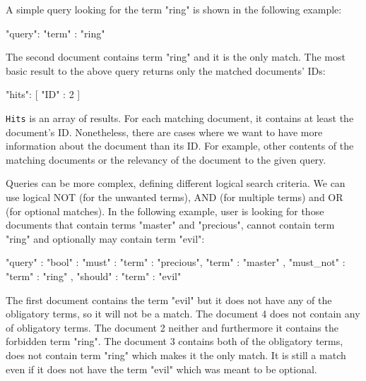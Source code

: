 A simple query looking for the term "ring" is shown in the following example:
\begin{code}
{ "query": { 
    "term" : "ring"
} }
\end{code}
The second document contains term "ring" and it is the only match. The most basic result to the above query returns only the matched documents' IDs:
\begin{code}
{ "hits": [
    { "ID" : 2 } ] 
}
\end{code}
\texttt{Hits} is an array of results. For each matching document, it contains at least the document's ID. Nonetheless, there are cases where we want to have more information about the document than its ID. For example, other contents of the matching documents or the relevancy of the document to the given query.

Queries can be more complex, defining different logical search criteria. We can use logical NOT (for the unwanted terms), AND (for multiple terms) and OR (for optional matches). In the following example, user is looking for those documents that contain terms "master" and "precious", cannot contain term "ring" and optionally may contain term "evil":
\newpage
\begin{code}
{ "query" : { 
     "bool" : {
       "must" : {
        "term" : "precious",
        "term" : "master"
      },  "must_not" : {
        "term" : "ring"
      },  "should" : {
        "term" : "evil"
      }
} } }
\end{code}
The first document contains the term "evil" but it does not have any of the obligatory terms, so it will not be a match. The document 4 does not contain any of obligatory terms. The document 2 neither and furthermore it contains the forbidden term "ring". The document 3 contains both of the obligatory terms, does not contain term  "ring" which makes it the only match. It is still a match even if it does not have the term "evil" which was meant to be optional.

